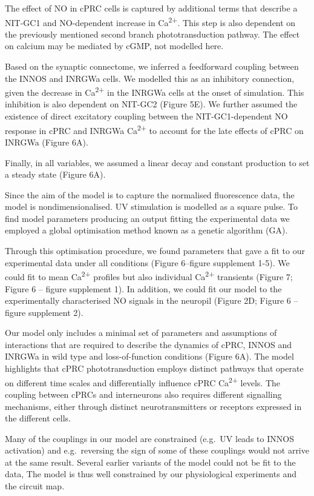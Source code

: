 \documentclass[
  11pt,
  letterpaper,
  DIV=11,
  numbers=noendperiod]{scrartcl}
\begin{document}
The effect of NO in cPRC cells is captured by additional terms that
describe a NIT-GC1 and NO-dependent increase in Ca\textsuperscript{2+}.
This step is also dependent on the previously mentioned second branch
phototransduction pathway. The effect on calcium may be mediated by
cGMP, not modelled here.

Based on the synaptic connectome, we inferred a feedforward coupling
between the INNOS and INRGWa cells. We modelled this as an inhibitory
connection, given the decrease in Ca\textsuperscript{2+} in the INRGWa
cells at the onset of simulation. This inhibition is also dependent on
NIT-GC2 (Figure 5E). We further assumed the existence of direct
excitatory coupling between the NIT-GC1-dependent NO response in cPRC
and INRGWa Ca\textsuperscript{2+} to account for the late effects of
cPRC on INRGWa (Figure 6A).

Finally, in all variables, we assumed a linear decay and constant
production to set a steady state (Figure 6A).

Since the aim of the model is to capture the normalised fluorescence
data, the model is nondimensionalised. UV stimulation is modelled as a
square pulse. To find model parameters producing an output fitting the
experimental data we employed a global optimisation method known as a
genetic algorithm (GA).

Through this optimisation procedure, we found parameters that gave a fit
to our experimental data under all conditions (Figure 6--figure
supplement 1-5). We could fit to mean Ca\textsuperscript{2+} profiles
but also individual Ca\textsuperscript{2+} transients (Figure 7; Figure
6 -- figure supplement 1). In addition, we could fit our model to the
experimentally characterised NO signals in the neuropil (Figure 2D;
Figure 6 -- figure supplement 2).

Our model only includes a minimal set of parameters and assumptions of
interactions that are required to describe the dynamics of cPRC, INNOS
and INRGWa in wild type and loss-of-function conditions (Figure 6A). The
model highlights that cPRC phototransduction employs distinct pathways
that operate on different time scales and differentially influence cPRC
Ca\textsuperscript{2+} levels. The coupling between cPRCs and
interneurons also requires different signalling mechanisms, either
through distinct neurotransmitters or receptors expressed in the
different cells.

Many of the couplings in our model are constrained (e.g.~UV leads to
INNOS activation) and e.g.~reversing the sign of some of these couplings
would not arrive at the same result. Several earlier variants of the
model could not be fit to the data, The model is thus well constrained
by our physiological experiments and the circuit map.
\end{document}
